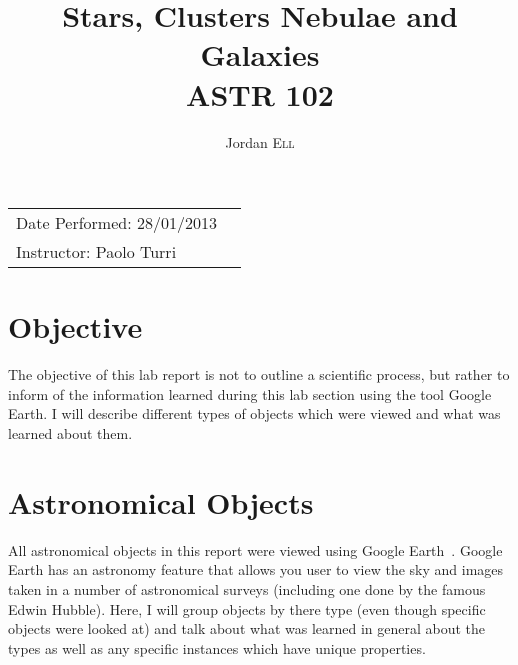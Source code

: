 \documentclass{article}
\title{Stars, Clusters Nebulae and Galaxies \\ ASTR 102} %
\author{Jordan \textsc{Ell}} %
\begin{document}
\maketitle %

\begin{tabular}{lr}
Date Performed: 28/01/2013\\ %
Instructor: Paolo Turri %
\end{tabular}

\setlength\parindent{0pt} %

\renewcommand{\labelenumi}{\alph{enumi}.} %


\section{Objective}
The objective of this lab report is not to outline a scientific process, but rather to inform
of the information learned during this lab section using the tool Google Earth. I will describe
different types of objects which were viewed and what was learned about them.

 

\section{Astronomical Objects}
All astronomical objects in this report were viewed using Google Earth~\cite{Google:2013}. 
Google Earth has an
astronomy feature that allows you user to view the sky and images taken in a number of
astronomical surveys (including one done by the famous Edwin Hubble). Here, I will group 
objects by there type (even though specific objects were looked at) and talk about what was
learned in general about the types as well as any specific instances which have unique 
properties.
\end{document}
